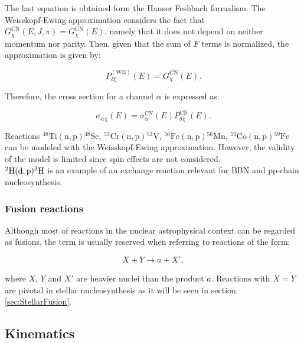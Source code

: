 \documentclass[openany]{book}
\begin{document}
The last equation is obtained form the Hauser Feshbach formalism. The Weisskopf-Ewing approximation considers the fact that $G^{\mathrm{CN}}_{\chi}(E, J, \pi) = G^{\mathrm{CN}}_{\chi}(E)$, namely that it does not depend on neither momentum nor parity. Then, given that the sum of $F$ terms is normalized, the approximation is given by:

\begin{equation}\label{micro_weisskopfEwing_decayP}
	P^{\mathrm{(WE)}}_{\delta \xi}(E) = G^{\mathrm{CN}}_{\chi}(E).
\end{equation} 

Therefore, the cross section for a channel $\alpha$ is expressed as: 

\begin{equation}\label{micro_weisskopfEwing_crossSection}
	\sigma_{\alpha \chi}(E) = \sigma^{\mathrm{CN}}_{\alpha}(E) P^{\mathrm{CN}}_{\delta \chi}(E).
\end{equation} 


Reactions $\mathrm{{}^{48}Ti(n, p){}^{48}Sc}$, $\mathrm{{}^{53}Cr(n, p){}^{53}V}$, $\mathrm{{}^{56}Fe(n, p){}^{56}Mn}$, $\mathrm{{}^{59}Co(n, p){}^{59}Fe}$ can be modeled with the Weisskopf-Ewing approximation. However, the validity of the model is limited since spin effects are not considered. \\


$\mathrm{{}^{2}H(d, p){}^{3}H}$ is an example of an exchange reaction relevant for BBN and pp-chain nucleosynthesis. 



\subsubsection{Fusion reactions} \label{ssub:fusionReactions}

Although most of reactions in the nuclear astrophysical context can be regarded as fusions, the term is usually reserved when referring to reactions of the form:

\begin{equation}  \label{eq:nuclearReaction_fusion}
	X + Y \rightarrow a + X',
\end{equation}

where $X$, $Y$ and $X'$ are heavier nuclei than the product $a$. Reactions with $X = Y$ are pivotal in stellar nucleosynthesis as it will be seen in section \ref{sec:StellarFusion}.

\subsection{Kinematics} \label{sub:kinematics}
\end{document}
